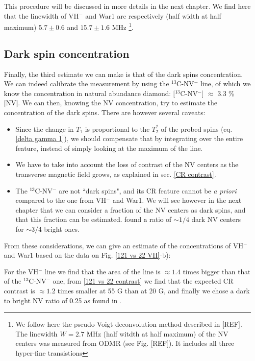 \documentclass[a4paper,11pt]{report}
\begin{document}
This procedure will be discussed in more details in the next chapter. We find here that the linewidth of VH$^-$ and War1 are respectively (half width at half maximum) $5.7\pm 0.6$ and $15.7\pm 1.6$ MHz \footnote{We follow here the pseudo-Voigt deconvolution method described in [REF]. The linewidth $W=2.7$ MHz (half witdth at half maximum) of the NV centers was measured from ODMR (see Fig. [REF]). It includes all three hyper-fine transistions}.

\subsection{Dark spin concentration}

Finally, the third estimate we can make is that of the dark spins concentration. We can indeed calibrate the measurement by using the $^{13}$C-NV$^-$ line, of which we know the concentration in natural abundance diamond: [$^{13}$C-NV$^-$] $\approx$ 3.3 \% [NV]. We can then, knowing the NV concentration, try to estimate the concentration of the dark spins. There are however several caveats:

\begin{itemize}
\item Since the change in $T_1$ is proportional to the $T_2^*$ of the probed spins (eq. \ref{delta gamma 1}), we should compensate that by integrating over the entire feature, instead of simply looking at the maximum of the line.
\item We have to take into account the loss of contrast of the NV centers as the transverse magnetic field grows, as explained in sec. \ref{CR contrast}.
\item The $^{13}$C-NV$^-$ are not ``dark spins", and its CR feature cannot be \textit{a priori} compared to the one from VH$^-$ and War1. We will see however in the next chapter that we can consider a fraction of the NV centers as dark spins, and that this fraction can be estimated. \citep{choi2017depolarization} found a ratio of $\sim 1/4$ dark NV centers for $\sim 3/4$ bright ones.
\end{itemize}

From these considerations, we can give an estimate of the concentrations of VH$^-$ and War1 based on the data on Fig. \ref{121 vs 22 VH}-b): 

For the VH$^-$ line we find that the area of the line is $\approx 1.4$ times bigger than that of the $^{13}$C-NV$^-$ one, from \ref{121 vs 22 contrast} we find that the expected CR contrast is $\approx 1.2$ times smaller at 55 G than at 20 G, and finally we chose a dark to bright NV ratio of 0.25 as found in \citep{choi2017depolarization}.
\end{document}
